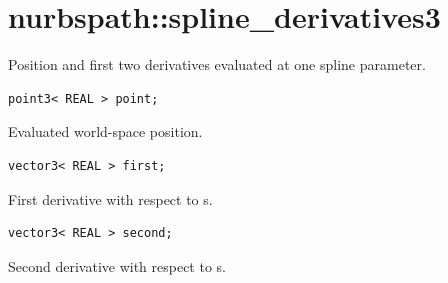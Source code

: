 \section{nurbspath::spline\_derivatives3}
Position and first two derivatives evaluated at one spline parameter.
\par\noindent\begin{minipage}{\linewidth}
\begin{lstlisting}[style=apireference]
point3< REAL > point;
\end{lstlisting}
{\footnotesize Evaluated world-space position.\par}
\end{minipage}\par\vspace{1pt}
\par\noindent\begin{minipage}{\linewidth}
\begin{lstlisting}[style=apireference]
vector3< REAL > first;
\end{lstlisting}
{\footnotesize First derivative with respect to s.\par}
\end{minipage}\par\vspace{1pt}
\par\noindent\begin{minipage}{\linewidth}
\begin{lstlisting}[style=apireference]
vector3< REAL > second;
\end{lstlisting}
{\footnotesize Second derivative with respect to s.\par}
\end{minipage}\par\vspace{1pt}

